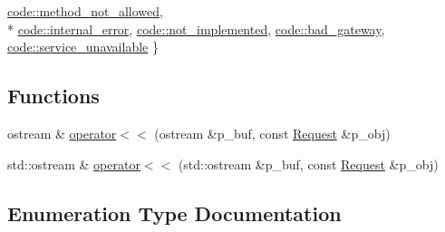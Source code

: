 \begin{DoxyCompactItemize}
\hyperlink{namespacextd_1_1network_1_1http_a55148922a7d13fe756e53e2ccad4b89cadd115df9e077388e1b70b344325094f3}{code\+::method\+\_\+not\+\_\+allowed}, 
\\*
\hyperlink{namespacextd_1_1network_1_1http_a55148922a7d13fe756e53e2ccad4b89ca3d9fd48f8a61d2ef1bcabffb3e2c2336}{code\+::internal\+\_\+error}, 
\hyperlink{namespacextd_1_1network_1_1http_a55148922a7d13fe756e53e2ccad4b89ca63877363c706f5095d05a54f8b57b0ae}{code\+::not\+\_\+implemented}, 
\hyperlink{namespacextd_1_1network_1_1http_a55148922a7d13fe756e53e2ccad4b89ca34b1f5a8577eed2180e10076d1aad14c}{code\+::bad\+\_\+gateway}, 
\hyperlink{namespacextd_1_1network_1_1http_a55148922a7d13fe756e53e2ccad4b89ca512d23352b911a1e9be84b5119e39095}{code\+::service\+\_\+unavailable}
 \}
\end{DoxyCompactItemize}
\subsection*{Functions}
\begin{DoxyCompactItemize}
\item 
ostream \& \hyperlink{namespacextd_1_1network_1_1http_a9cd58530344372f236be8478d9c41ac3}{operator$<$$<$} (ostream \&p\+\_\+buf, const \hyperlink{classxtd_1_1network_1_1http_1_1Request}{Request} \&p\+\_\+obj)
\item 
std\+::ostream \& \hyperlink{namespacextd_1_1network_1_1http_a48e500be5ba75ae2ce3d8bdb549f9211}{operator$<$$<$} (std\+::ostream \&p\+\_\+buf, const \hyperlink{classxtd_1_1network_1_1http_1_1Request}{Request} \&p\+\_\+obj)
\end{DoxyCompactItemize}


\subsection{Enumeration Type Documentation}

